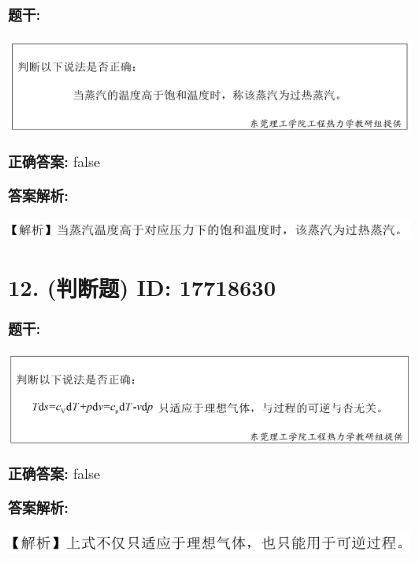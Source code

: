 \documentclass[12pt]{article}
\begin{document}
\textbf{题干:}


\begin{center}\includegraphics[width=0.8\textwidth, height=0.25\textheight, keepaspectratio]{question_11_17718626/title_img_1.png}\end{center}

\textbf{正确答案:}
false

\textbf{答案解析:}


\begin{center}\includegraphics[width=0.8\textwidth, height=0.25\textheight, keepaspectratio]{question_11_17718626/correct_replay_img_1.png}\end{center}

\vspace{0.5em}\hrulefill\vspace{1em}

\subsection*{12. (判断题) \small ID: 17718630}

\textbf{题干:}


\begin{center}\includegraphics[width=0.8\textwidth, height=0.25\textheight, keepaspectratio]{question_12_17718630/title_img_1.png}\end{center}

\textbf{正确答案:}
false

\textbf{答案解析:}


\begin{center}\includegraphics[width=0.8\textwidth, height=0.25\textheight, keepaspectratio]{question_12_17718630/correct_replay_img_1.png}\end{center}
\end{document}
